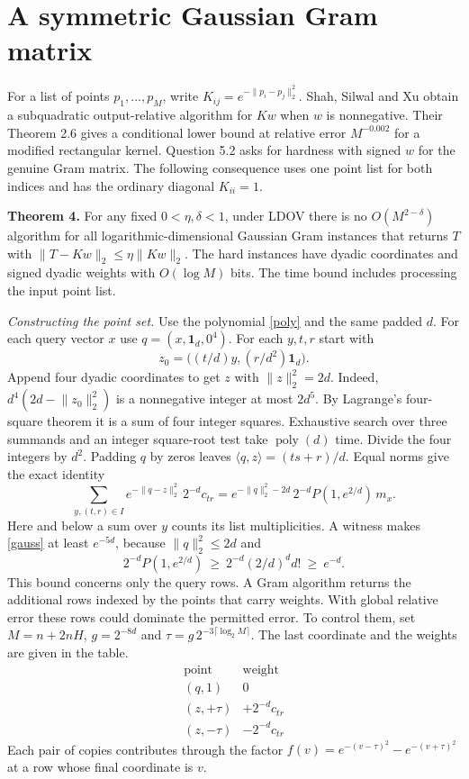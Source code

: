 \documentclass[11pt,letterpaper]{article}
\newcommand{\one}{\mathbf 1}\newcommand{\abs}[1]{\lvert#1\rvert}
\newcommand{\norm}[1]{\lVert#1\rVert}
\newcommand{\result}[1]{\smallskip\textbf{#1}\enspace}
\begin{document}
\section{A symmetric Gaussian Gram matrix}
For a list of points $p_1,\ldots,p_M$, write $K_{ij}=e^{-\norm{p_i-p_j}_2^2}$. Shah, Silwal and Xu \cite[Theorem 2.1]{ssx} obtain a subquadratic output-relative algorithm for $Kw$ when $w$ is nonnegative. Their Theorem 2.6 gives a conditional lower bound at relative error $M^{-0.002}$ for a modified rectangular kernel. Question 5.2 asks for hardness with signed $w$ for the genuine Gram matrix. The following consequence uses one point list for both indices and has the ordinary diagonal $K_{ii}=1$.

\result{Theorem 4.} For any fixed $0<\eta,\delta<1$, under LDOV there is no $O(M^{2-\delta})$ algorithm for all logarithmic-dimensional Gaussian Gram instances that returns $T$ with $\norm{T-Kw}_2\le\eta\norm{Kw}_2$. The hard instances have dyadic coordinates and signed dyadic weights with $O(\log M)$ bits. The time bound includes processing the input point list.

\textit{Constructing the point set.} Use the polynomial \eqref{poly} and the same padded $d$. For each query vector $x$ use $q=(x,\one_d,0^4)$. For each $y,t,r$ start with
\[
 z_0=\big((t/d)y,(r/d^2)\one_d\big).
\]
Append four dyadic coordinates to get $z$ with $\norm z_2^2=2d$. Indeed, $d^4(2d-\norm{z_0}_2^2)$ is a nonnegative integer at most $2d^5$. By Lagrange's four-square theorem it is a sum of four integer squares. Exhaustive search over three summands and an integer square-root test take $\operatorname{poly}(d)$ time. Divide the four integers by $d^2$. Padding $q$ by zeros leaves $\langle q,z\rangle=(ts+r)/d$. Equal norms give the exact identity
\begin{equation}
 \sum_{y,(t,r)\in I} e^{-\norm{q-z}_2^2}\,2^{-d}c_{tr}
 =e^{-\norm q_2^2-2d}\,2^{-d}P(1,e^{2/d})\,m_x .\label{gauss}
\end{equation}
Here and below a sum over $y$ counts its list multiplicities. A witness makes \eqref{gauss} at least $e^{-5d}$, because $\norm q_2^2\le2d$ and
\[
 2^{-d}P(1,e^{2/d})\ \ge\ 2^{-d}(2/d)^d d!\ \ge\ e^{-d}.
\]
This bound concerns only the query rows. A Gram algorithm returns the additional rows indexed by the points that carry weights. With global relative error these rows could dominate the permitted error. To control them, set $M=n+2nH$, $g=2^{-8d}$ and $\tau=g\,2^{-3\lceil\log_2 M\rceil}$. The last coordinate and the weights are given in the table.
\[
 \begin{array}{c|c}
 \text{point}&\text{weight}\\ \hline
 (q,1)&0\\
 (z,+\tau)&+2^{-d}c_{tr}\\
 (z,-\tau)&-2^{-d}c_{tr}
 \end{array}
\]
Each pair of copies contributes through the factor
$f(v)=e^{-(v-\tau)^2}-e^{-(v+\tau)^2}$ at a row whose final coordinate is $v$.
\newpage
\end{document}
